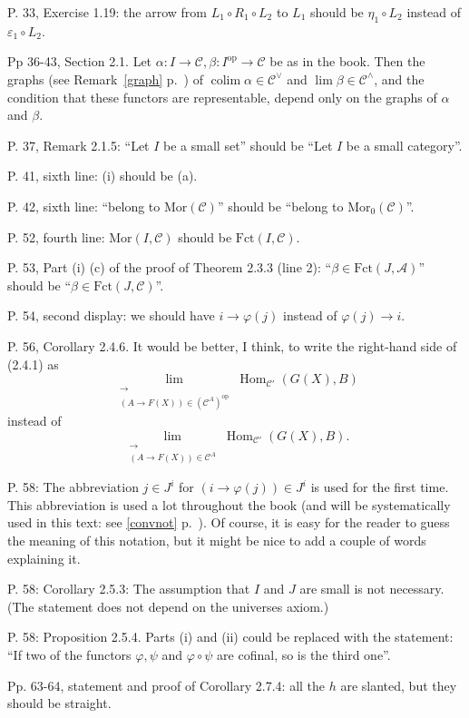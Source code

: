 \documentclass[12pt]{article}
\theoremstyle{remark}%
\newcommand{\n}{\noindent}
\newcommand{\A}{\mathcal A}
\newcommand{\C}{\mathcal C}
\DeclareMathOperator*{\coli}{colim}
\DeclareMathOperator{\h}{Hom}
\DeclareMathOperator{\op}{op}
\begin{document}
\n P. 33, Exercise 1.19: the arrow from $L_1\circ R_1\circ L_2$ to $L_1$ should be $\eta_1\circ L_2$ instead of $\varepsilon_1\circ L_2$. 

\n Pp 36-43, Section 2.1. Let $\alpha:I\to\C,\beta:I^{\op}\to\C$ be as in the book. Then the graphs (see Remark~\ref{graph} p.~\pageref{graph}) of $\coli\alpha\in\C^\vee$ and $\lim\beta\in\C^\wedge$, and the condition that these functors are representable, depend only on the graphs of $\alpha$ and $\beta$. 

\n P. 37, Remark 2.1.5: ``Let $I$ be a small set'' should be ``Let $I$ be a small category''.  

\n P. 41, sixth line: (i) should be (a). 

\n P. 42, sixth line: ``belong to $\text{Mor}(\C)$'' should be ``belong to $\text{Mor}_0(\C)$''.

\n P. 52, fourth line: $\text{Mor}(I,\C)$ should be $\text{Fct}(I,\C)$. 

\n P. 53, Part (i) (c) of the proof of Theorem 2.3.3 (line 2): ``$\beta\in\text{Fct}(J,\A)$'' should be ``$\beta\in\text{Fct}(J,\C)$''.

\n P. 54, second display: we should have $i\to\varphi(j)$ instead of $\varphi(j)\to i$. 

\n P. 56, Corollary 2.4.6. It would be better, I think, to write the right-hand side of (2.4.1) as 
$$
\lim_{\substack{\longrightarrow\\ (A\to F(X))\in(\C^A)^{\op}}}\h_{\C'}(G(X),B)
$$ 
instead of 
$$ 
\lim_{\substack{\longrightarrow\\ (A\to F(X))\in\C^A}}\h_{\C'}(G(X),B). 
$$

\n P. 58: The abbreviation $j\in J^i$ for $(i\to\varphi(j))\in J^i$ is used for the first time. This abbreviation is used a lot throughout the book (and will be systematically used in this text: see \eqref{convnot} p.~\pageref{convnot}). Of course, it is easy for the reader to guess the meaning of this notation, but it might be nice to add a couple of words explaining it. 

\n P. 58: Corollary 2.5.3: The assumption that $I$ and $J$ are small is not necessary. (The statement does not depend on the universes axiom.) 

\n P. 58: Proposition 2.5.4. Parts (i) and (ii) could be replaced with the statement: ``If two of the functors $\varphi,\psi$ and $\varphi\circ\psi$ are cofinal, so is the third one''.

\n Pp. 63-64, statement and proof of Corollary 2.7.4: all the $h$ are slanted, but they should be straight.
\end{document}
